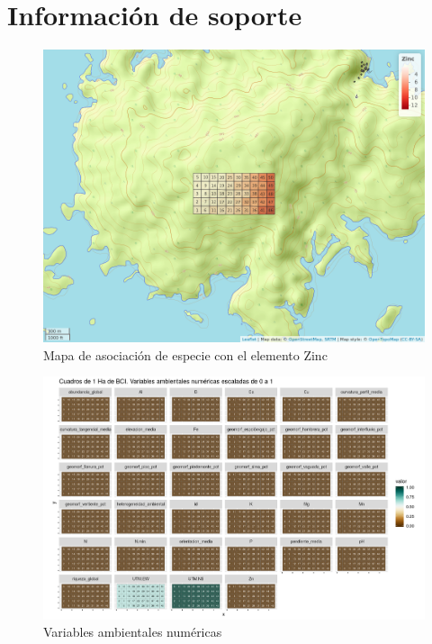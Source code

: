 \documentclass[11pt,]{article}
\begin{document}
\section{Información de soporte}\label{informaciuxf3n-de-soporte}

\begin{figure}
\centering
\includegraphics[width=1.10000\textwidth]{mapa_zinc.png}
\caption{Mapa de asociación de especie con el elemento Zinc}
\end{figure}

\begin{figure}
\centering
\includegraphics[width=1.10000\textwidth]{mapas_variables_ambientales_numericas.png}
\caption{Variables ambientales numéricas}
\end{figure}
\end{document}

